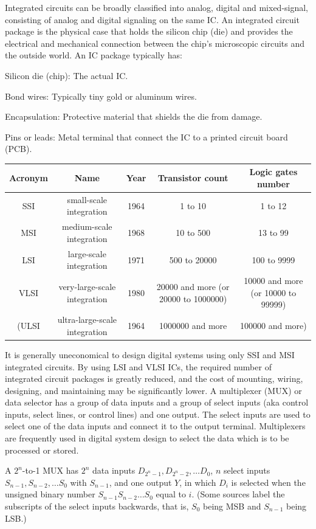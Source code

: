 \documentclass[a4paper,12pt]{report}
\begin{document}
Integrated circuits can be broadly classified into analog, digital and mixed-signal, consisting of analog and digital signaling on the same IC.
An integrated circuit package is the physical case that holds the silicon chip (die) and provides the electrical and mechanical connection between the chip’s microscopic circuits and the outside world. An IC package typically has:
\bit
\item Silicon die (chip): The actual IC.
\item Bond wires: Typically tiny gold or aluminum wires.
\item Encapsulation: Protective material that shields the die from damage.
\item Pins or leads: Metal terminal that connect the IC to a printed circuit board (PCB).
\eit
{}
\begin{longtable}[c]{|c|c|c|c|c|}
    \hline
    Acronym & Name & Year & Transistor count & Logic gates number \\\hline
    SSI & small-scale integration & 1964 & 1 to 10 & 1 to 12 \\\hline
    MSI & medium-scale integration & 1968 & 10 to 500 & 13 to 99 \\\hline
    LSI & large-scale integration & 1971 & 500 to 20000 & 100 to 9999 \\\hline
    VLSI & very-large-scale integration & 1980 & 20000 and more (or 20000 to 1000000) & 10000 and more (or 10000 to 99999) \\\hline
    (ULSI & ultra-large-scale integration & 1964 & 1000000 and more & 100000 and more) \\\hline
\end{longtable}

It is generally uneconomical to design digital systems using only SSI and MSI integrated circuits. By using LSI and VLSI ICs, the required number of integrated circuit packages is greatly reduced, and the cost of mounting, wiring, designing, and maintaining may be significantly lower.
A multiplexer (MUX) or data selector has a group of data inputs and a group of select inputs (aka control inputs, select lines, or control lines) and one output. The select inputs are used to select one of the data inputs and connect it to the output terminal. Multiplexers are frequently used in digital system design to select the data which is to be processed or stored.

A $2^n$-to-1 MUX has $2^n$ data inputs $D_{2^n-1},D_{2^n-2},\ldots D_0$, $n$ select inputs $S_{n-1},S_{n-2},\ldots S_0$ with $S_{n-1}$, and one output $Y$, in which $D_i$ is selected when the unsigned binary number $S_{n-1}S_{n-2}\ldots S_0$ equal to $i$. (Some sources label the subscripts of the select inputs backwards, that is, $S_0$ being MSB and $S_{n-1}$ being LSB.)
\end{document}
